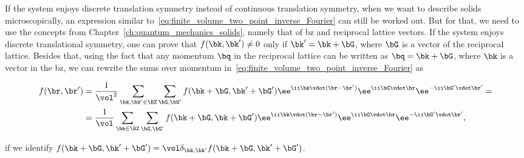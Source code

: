 If the system enjoys discrete translation symmetry instead of continuous translation symmetry, when we want to describe solids microscopically, an expression similar to~\eqref{eq:finite_volume_two_point_inverse_Fourier} can still be worked out.
But for that, we need to use the concepts from Chapter~\ref{ch:quantum_mechanics_solids}, namely that of \gls{bz} and reciprocal lattice vectors.
If the system enjoys discrete translational symmetry, one can prove that $f(\bk,\bk')\neq0$ only if $\bk'=\bk+\bG$, where $\bG$ is a vector of the reciprocal lattice.
Besides that, using the fact that any momentum $\bq$ in the reciprocal lattice can be written as $\bq=\bk+\bG$, where $\bk$ is a vector in the \gls{bz}, we can rewrite the sums over momentum in~\eqref{eq:finite_volume_two_point_inverse_Fourier} as

\begin{equation}\label{eq:two_point_discrete_inverse_Fourier}
\begin{aligned}
    f(\br,\br') &= \frac{1}{\vol^2}\sum_{\bk,\bk' \in \BZ} \sum_{\bG,\bG'} f(\bk+\bG,\bk'+\bG')\ee^{\ii \bk \vdot (\br-\br')}\ee^{\ii \bG \vdot \br} \ee^{-\ii \bG' \vdot \br'} = \\
                &= \frac{1}{\vol}\sum_{\bk \in \BZ}\sum_{\bG,\bG'}f(\bk+\bG,\bk+\bG')\ee^{\ii \bk \vdot (\br-\br')}\ee^{\ii \bG \vdot \br} \ee^{-\ii \bG' \vdot \br'},
\end{aligned}
\end{equation}

\noindent if we identify $f(\bk+\bG,\bk'+\bG')=\vol\delta_{\bk,\bk'}f(\bk+\bG,\bk'+\bG')$.
